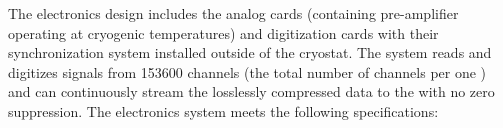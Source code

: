 The  electronics design includes the analog  cards (containing pre-amplifier  operating at cryogenic temperatures) and digitization cards with their synchronization system installed outside of the cryostat. The system reads and digitizes signals from \num{153600} channels (the total number of  channels per one ) and can continuously stream the losslessly compressed data to the  with no zero suppression. 
The%
 electronics system meets the following specifications: %
